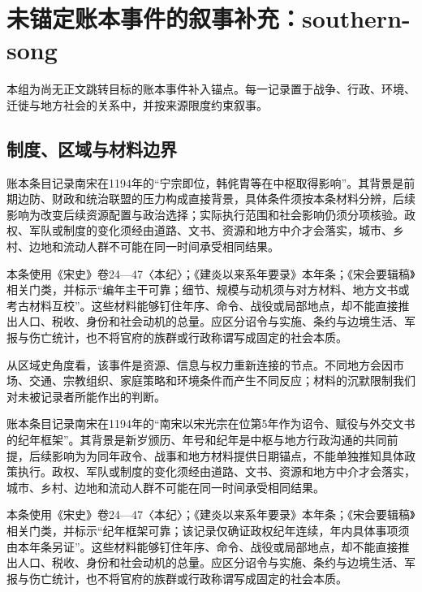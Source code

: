 \section{未锚定账本事件的叙事补充：southern-song}

\label{sec:anchor-batch-two-southern-song}

本组为尚无正文跳转目标的账本事件补入锚点。每一记录置于战争、行政、环境、迁徙与地方社会的关系中，并按来源限度约束叙事。

\subsection{制度、区域与材料边界}

账本条目记录南宋在1194年的“宁宗即位，韩侂胄等在中枢取得影响”。其背景是前期边防、财政和统治联盟的压力构成直接背景，具体条件须按本条材料分辨，后续影响为改变后续资源配置与政治选择；实际执行范围和社会影响仍须分项核验。政权、军队或制度的变化须经由道路、文书、资源和地方中介才会落实，城市、乡村、边地和流动人群不可能在同一时间承受相同结果。

本条使用《宋史》卷24—47〈本纪〉；《建炎以来系年要录》本年条；《宋会要辑稿》相关门类，并标示“编年主干可靠；细节、规模与动机须与对方材料、地方文书或考古材料互校”。这些材料能够钉住年序、命令、战役或局部地点，却不能直接推出人口、税收、身份和社会动机的总量。应区分诏令与实施、条约与边境生活、军报与伤亡统计，也不将官府的族群或行政称谓写成固定的社会本质。

从区域史角度看，该事件是资源、信息与权力重新连接的节点。不同地方会因市场、交通、宗教组织、家庭策略和环境条件而产生不同反应；材料的沉默限制我们对未被记录者所能作出的判断。

账本条目记录南宋在1194年的“南宋以宋光宗在位第5年作为诏令、赋役与外交文书的纪年框架”。其背景是新岁颁历、年号和纪年是中枢与地方行政沟通的共同前提，后续影响为为同年政令、战事和地方材料提供日期锚点，不能单独推知具体政策执行。政权、军队或制度的变化须经由道路、文书、资源和地方中介才会落实，城市、乡村、边地和流动人群不可能在同一时间承受相同结果。

本条使用《宋史》卷24—47〈本纪〉；《建炎以来系年要录》本年条；《宋会要辑稿》相关门类，并标示“纪年框架可靠；该记录仅确证政权纪年连续，年内具体事项须由本年条另证”。这些材料能够钉住年序、命令、战役或局部地点，却不能直接推出人口、税收、身份和社会动机的总量。应区分诏令与实施、条约与边境生活、军报与伤亡统计，也不将官府的族群或行政称谓写成固定的社会本质。

